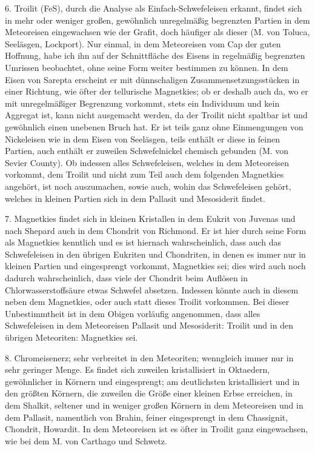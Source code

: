 \documentclass[a4paper, 11pt, oneside]{article}
\begin{document}
6. Troilit (FeS), durch die Analyse als Einfach-Schwefeleisen erkannt, findet sich in mehr oder weniger großen, gewöhnlich unregelmäßig begrenzten Partien in dem Meteoreisen eingewachsen wie der Grafit, doch häufiger als dieser (M. von Toluca, Seeläsgen, Lockport). Nur einmal, in dem Meteoreisen vom Cap der guten Hoffnung, habe ich ihn auf der Schnittfläche des Eisens in regelmäßig begrenzten Umrissen beobachtet, ohne seine Form weiter bestimmen zu können. In dem Eisen von Sarepta erscheint er mit dünnschaligen Zusammensetzungsstücken in einer Richtung, wie öfter der tellurische Magnetkies; ob er deshalb auch da, wo er mit unregelmäßiger Begrenzung vorkommt, stets ein Individuum und kein Aggregat ist, kann nicht ausgemacht werden, da der Troilit nicht spaltbar ist und gewöhnlich einen unebenen Bruch hat. Er ist teils ganz ohne Einmengungen von Nickeleisen wie in dem Eisen von Seeläsgen, teils enthält er diese in feinen Partien, auch enthält er zuweilen Schwefelnickel chemisch gebunden (M. von Sevier County). Ob indessen alles Schwefeleisen, welches in dem Meteoreisen vorkommt, dem Troilit und nicht zum Teil auch dem folgenden Magnetkies angehört, ist noch auszumachen, sowie auch, wohin das Schwefeleisen gehört, welches in kleinen Partien sich in dem Pallasit und Mesosiderit findet.

7. Magnetkies findet sich in kleinen Kristallen in dem Eukrit von Juvenas und nach Shepard auch in dem Chondrit von Richmond. Er ist hier durch seine Form als Magnetkies kenntlich und es ist hiernach wahrscheinlich, dass auch das Schwefeleisen in den übrigen Eukriten und Chondriten, in denen es immer nur in kleinen Partien und eingesprengt vorkommt, Magnetkies sei; dies wird auch noch dadurch wahrscheinlich, dass viele der Chondrit beim Auflösen in Chlorwasserstoffsäure etwas Schwefel absetzen. Indessen könnte auch in diesem neben dem Magnetkies, oder auch statt dieses Troilit vorkommen. Bei dieser Unbestimmtheit ist in dem Obigen vorläufig angenommen, dass alles Schwefeleisen in dem Meteoreisen Pallasit und Mesosiderit: Troilit und in den übrigen Meteoriten: Magnetkies sei.

8. Chromeisenerz; sehr verbreitet in den Meteoriten; wenngleich immer nur in sehr geringer Menge. Es findet sich zuweilen kristallisiert in Oktaedern, gewöhnlicher in Körnern und eingesprengt; am deutlichsten kristallisiert und in den größten Körnern, die zuweilen die Größe einer kleinen Erbse erreichen, in dem Shalkit, seltener und in weniger großen Körnern in dem Meteoreisen und in dem Pallasit, namentlich von Brahin, feiner eingesprengt in dem Chassignit, Chondrit, Howardit. In dem Meteoreisen ist es öfter in Troilit ganz eingewachsen, wie bei dem M. von Carthago und Schwetz.
\end{document}
